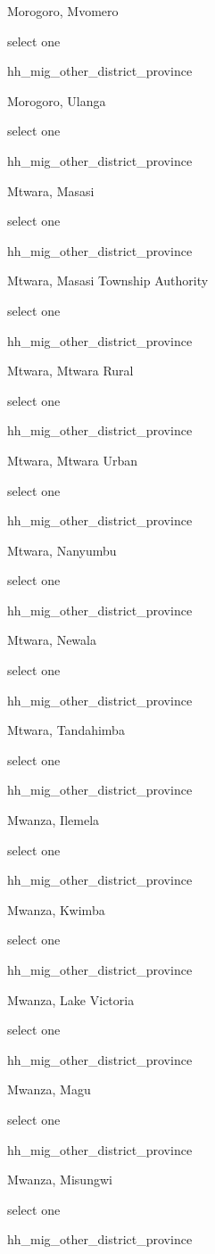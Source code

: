 \documentclass[]{article}
\begin{document}
Morogoro, Mvomero

select one

hh\_mig\_other\_district\_province

Morogoro, Ulanga

select one

hh\_mig\_other\_district\_province

Mtwara, Masasi

select one

hh\_mig\_other\_district\_province

Mtwara, Masasi Township Authority

select one

hh\_mig\_other\_district\_province

Mtwara, Mtwara Rural

select one

hh\_mig\_other\_district\_province

Mtwara, Mtwara Urban

select one

hh\_mig\_other\_district\_province

Mtwara, Nanyumbu

select one

hh\_mig\_other\_district\_province

Mtwara, Newala

select one

hh\_mig\_other\_district\_province

Mtwara, Tandahimba

select one

hh\_mig\_other\_district\_province

Mwanza, Ilemela

select one

hh\_mig\_other\_district\_province

Mwanza, Kwimba

select one

hh\_mig\_other\_district\_province

Mwanza, Lake Victoria

select one

hh\_mig\_other\_district\_province

Mwanza, Magu

select one

hh\_mig\_other\_district\_province

Mwanza, Misungwi

select one

hh\_mig\_other\_district\_province
\end{document}
